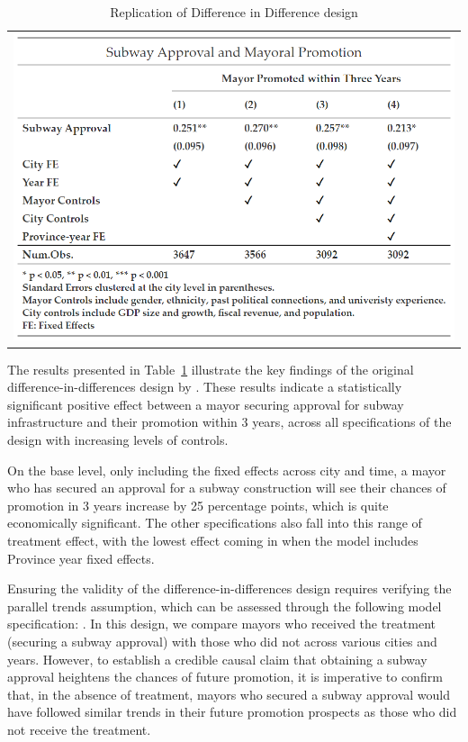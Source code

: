 \documentclass[12pt, ]{article}
\begin{document}
\hypertarget{tbl-replication}{}
\begin{longtable}[]{@{}l@{}}
\caption{\label{tbl-replication}Replication of \citet{lei2022private}
Difference in Difference design}\tabularnewline
\toprule\noalign{}
\endfirsthead
\endhead
\bottomrule\noalign{}
\endlastfoot
\includegraphics{tables/did_replication.png} \\
\end{longtable}

The results presented in Table~\ref{tbl-replication} illustrate the key
findings of the original difference-in-differences design by
\citet{lei2022private}. These results indicate a statistically
significant positive effect between a mayor securing approval for subway
infrastructure and their promotion within 3 years, across all
specifications of the design with increasing levels of controls.

On the base level, only including the fixed effects across city and
time, a mayor who has secured an approval for a subway construction will
see their chances of promotion in 3 years increase by 25 percentage
points, which is quite economically significant. The other
specifications also fall into this range of treatment effect, with the
lowest effect coming in when the model includes Province year fixed
effects.

Ensuring the validity of the difference-in-differences design requires
verifying the parallel trends assumption, which can be assessed through
the following model specification: . In this design, we compare mayors
who received the treatment (securing a subway approval) with those who
did not across various cities and years. However, to establish a
credible causal claim that obtaining a subway approval heightens the
chances of future promotion, it is imperative to confirm that, in the
absence of treatment, mayors who secured a subway approval would have
followed similar trends in their future promotion prospects as those who
did not receive the treatment.
\end{document}
